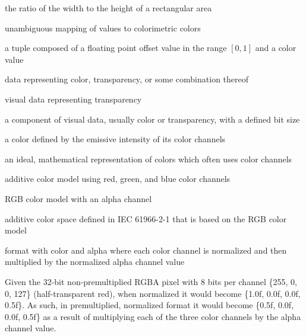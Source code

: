 %
the ratio of the width to the height of a rectangular area

%
unambiguous mapping of values to colorimetric colors

%
a tuple composed of a floating point offset value in the range $[0, 1]$ and a color value

%
data representing color, transparency, or some combination thereof

%
visual data representing transparency

%
a component of visual data, usually color or transparency, with a defined bit size

%
a color defined by the emissive intensity of its color channels

%
an ideal, mathematical representation of colors which often uses color channels

%
%
 additive color model using red, green, and blue color channels

%
%
 RGB color model with an alpha channel

%
%
 additive color space defined in IEC 61966-2-1 that is based on the RGB color model

%
format with color and alpha where each color channel is normalized and then multiplied by the normalized alpha channel value
\begin{example}
Given the 32-bit non-premultiplied RGBA pixel with 8 bits per channel \{255, 0, 
0, 127\} (half-transparent red), when normalized it would become \{1.0f, 0.0f, 
0.0f, 0.5f\}. As such, in premultiplied, normalized format it would become 
\{0.5f, 0.0f, 0.0f, 0.5f\} as a result of multiplying each of the three color channels by the alpha channel value.
\end{example}

